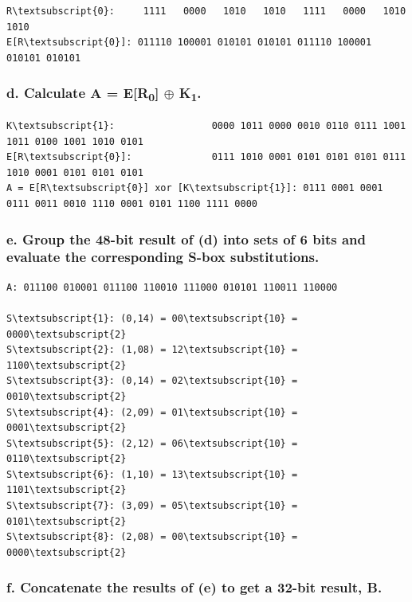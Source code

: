 \documentclass[
    article,            %
    11pt,               %
    oneside,            %
    a4paper,            %
    english,            %
    brazil,             %
    sumario=tradicional,
    ]{abntex2}
\begin{document}
\begin{Verbatim}[commandchars=\\\{\}, fontsize=\footnotesize]
R\textsubscript{0}:     1111   0000   1010   1010   1111   0000   1010   1010
E[R\textsubscript{0}]: 011110 100001 010101 010101 011110 100001 010101 010101
\end{Verbatim}

\subsubsection*{\textbf{d. Calculate A = E[R\textsubscript{0}] $\oplus$ K\textsubscript{1}.}}

\begin{Verbatim}[commandchars=\\\{\}, fontsize=\footnotesize]
K\textsubscript{1}:                 0000 1011 0000 0010 0110 0111 1001 1011 0100 1001 1010 0101
E[R\textsubscript{0}]:              0111 1010 0001 0101 0101 0101 0111 1010 0001 0101 0101 0101
A = E[R\textsubscript{0}] xor [K\textsubscript{1}]: 0111 0001 0001 0111 0011 0010 1110 0001 0101 1100 1111 0000
\end{Verbatim}

\subsubsection*{\textbf{e. Group the 48-bit result of (d) into sets of 6 bits and evaluate the corresponding S-box substitutions.}}

\begin{Verbatim}[commandchars=\\\{\}, fontsize=\footnotesize]
A: 011100 010001 011100 110010 111000 010101 110011 110000

S\textsubscript{1}: (0,14) = 00\textsubscript{10} = 0000\textsubscript{2}
S\textsubscript{2}: (1,08) = 12\textsubscript{10} = 1100\textsubscript{2}
S\textsubscript{3}: (0,14) = 02\textsubscript{10} = 0010\textsubscript{2}
S\textsubscript{4}: (2,09) = 01\textsubscript{10} = 0001\textsubscript{2}
S\textsubscript{5}: (2,12) = 06\textsubscript{10} = 0110\textsubscript{2}
S\textsubscript{6}: (1,10) = 13\textsubscript{10} = 1101\textsubscript{2}
S\textsubscript{7}: (3,09) = 05\textsubscript{10} = 0101\textsubscript{2}
S\textsubscript{8}: (2,08) = 00\textsubscript{10} = 0000\textsubscript{2}

\end{Verbatim}

\subsubsection*{\textbf{f. Concatenate the results of (e) to get a 32-bit result, B.}}
\end{document}
